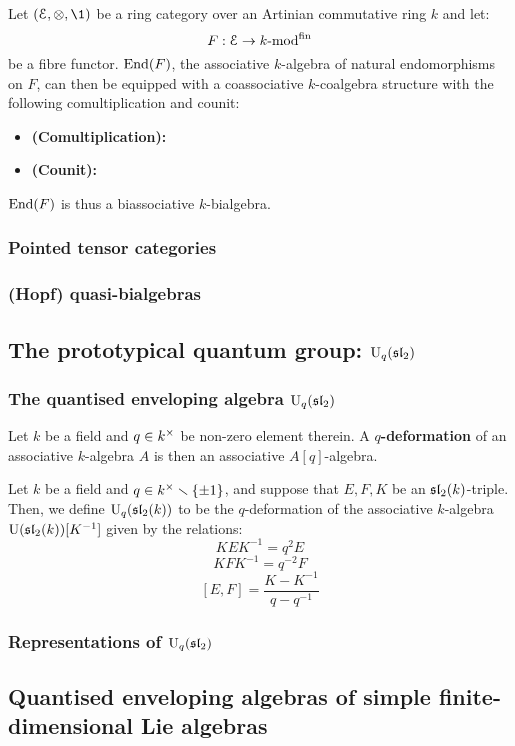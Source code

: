             \begin{proposition} \label{prop: bialgebra_structures_on_fibre_functors}
                Let $(\E, \tensor, \1)$ be a ring category over an Artinian commutative ring $k$ and let:
                    $$F: \E \to k\mod^{\fin}$$
                be a fibre functor. $\End(F)$, the associative $k$-algebra of natural endomorphisms on $F$, can then be equipped with a coassociative $k$-coalgebra structure with the following comultiplication and counit:
                    \begin{itemize}
                        \item \textbf{(Comultiplication):} 
                        \item \textbf{(Counit):}
                    \end{itemize}
                $\End(F)$ is thus a biassociative $k$-bialgebra.
            \end{proposition}
        
        \subsubsection{Pointed tensor categories}
        
        \subsubsection{(Hopf) quasi-bialgebras}

    \subsection{The prototypical quantum group: \texorpdfstring{$\U_q(\sl_2)$}{}}
        \subsubsection{The quantised enveloping algebra \texorpdfstring{$\U_q(\sl_2)$}{}}
            \begin{definition}[$q$-deformations] \label{def: q_deformations}
                Let $k$ be a field and $q \in k^{\x}$ be non-zero element therein. A \textbf{$q$-deformation} of an associative $k$-algebra $A$ is then an associative $A[q]$-algebra.
            \end{definition}
            \begin{definition} \label{def: quantised_U(sl2)}
                Let $k$ be a field and $q \in k^{\x} \setminus \{\pm 1\}$, and suppose that $E, F, K$ be an $\sl_2(k)$-triple. Then, we define $\U_q(\sl_2(k))$ to be the $q$-deformation of the associative $k$-algebra $\U(\sl_2(k))[K^{-1}]$ given by the relations:
                    $$KEK^{-1} = q^2 E$$
                    $$KFK^{-1} = q^{-2} F$$
                    $$[E, F] = \frac{K - K^{-1}}{q - q^{-1}}$$
            \end{definition}
        
        \subsubsection{Representations of \texorpdfstring{$\U_q(\sl_2)$}{}}
    
    \subsection{Quantised enveloping algebras of simple finite-dimensional Lie algebras}